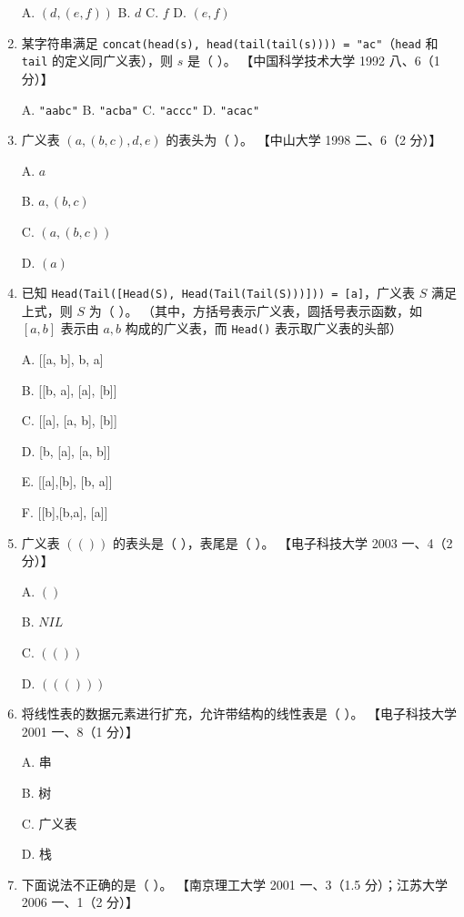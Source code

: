 \documentclass[lang=cn,newtx,10pt,scheme=chinese]{elegantbook}
\begin{document}
\begin{enumerate}
    A. $(d, (e, f))$ \quad B. $d$ \quad C. $f$ \quad D. $(e, f)$  

    \item 某字符串满足 \texttt{concat(head(s), head(tail(tail(s)))) = "ac"}（\texttt{head} 和 \texttt{tail} 的定义同广义表），则 $s$ 是（ ）。  
    【中国科学技术大学 1992 八、6（1 分）】  

    A. \texttt{"aabc"} \quad B. \texttt{"acba"} \quad C. \texttt{"accc"} \quad D. \texttt{"acac"}  

    \item 广义表 $(a, (b, c), d, e)$ 的表头为（ ）。  
    【中山大学 1998 二、6（2 分）】  

    A. $a$  

    B. $a, (b, c)$  

    C. $(a, (b, c))$  

    D. $(a)$  

    \item 已知 \texttt{Head(Tail([Head(S), Head(Tail(Tail(S)))])) = [a]}，广义表 $S$ 满足上式，则 $S$ 为（ ）。  
    （其中，方括号表示广义表，圆括号表示函数，如 $[a, b]$ 表示由 $a, b$ 构成的广义表，而 \texttt{Head()} 表示取广义表的头部）  

    A. [[a, b], b, a]  

    B. [[b, a], [a], [b]]  

    C. [[a], [a, b], [b]]  

    D. [b, [a], [a, b]]  

    E. [[a],[b], [b, a]]  

    F. [[b],[b,a], [a]]


    \item 广义表 $(( ))$ 的表头是（ ），表尾是（ ）。  
    【电子科技大学 2003 一、4（2 分）】  

    A. $()$  

    B. $NIL$

    C. $(())$ 

    D. $((()))$  

    \item 将线性表的数据元素进行扩充，允许带结构的线性表是（ ）。  
    【电子科技大学 2001 一、8（1 分）】  

    A. 串  

    B. 树  

    C. 广义表  

    D. 栈  

    \item 下面说法不正确的是（ ）。  
    【南京理工大学 2001 一、3（1.5 分）；江苏大学 2006 一、1（2 分）】 


\end{enumerate}
\end{document}
